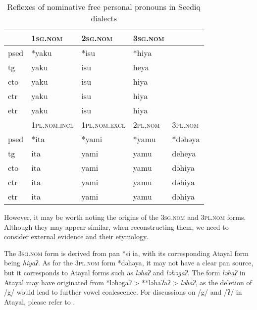 \begin{table}[!htbp]
\centering
\caption{Reflexes of nominative free personal pronouns in Seediq dialects}
\label{tab:nomfree}
\begin{tabular}{lllll}
\hline
      & \textsc{1sg.nom}      & \textsc{2sg.nom}      & \textsc{3sg.nom} &         \\ \hline
\acs{psed} & *yaku        & *isu         & *hiya   &         \\
\acs{tg}  & yaku         & isu          & heya    &         \\
\acs{cto}  & yaku         & isu          & hiya    &         \\
\acs{ctr} & yaku         & isu          & hiya    &         \\
\acs{etr} & yaku         & isu          & hiya    &         \\ \hline
      & \textsc{1pl.nom.incl} & \textsc{1pl.nom.excl} & \textsc{2pl.nom} & \textsc{3pl.nom} \\ \hline
\acs{psed} & *ita         & *yami        & *yamu   & *dəhəya \\
\acs{tg}  & ita          & yami         & yamu    & deheya  \\
\acs{cto}  & ita          & yami         & yamu    & dəhiya  \\
\acs{ctr} & ita          & yami         & yamu    & dəhiya  \\
\acs{etr} & ita          & yami         & yamu    & dəhiya  \\ \hline
\end{tabular}
\end{table}

However, it may be worth noting the origins of the \textsc{3sg.nom} and \textsc{3pl.nom} forms. Although they may appear similar, when reconstructing them, we need to consider external evidence and their etymology.

The \textsc{3sg.nom} form is derived from \acs{pan} *si ia, with its corresponding Atayal form being \textit{hiyaʔ}. As for the \textsc{3pl.nom} form *dəhəya, it may not have a clear \acs{pan} source, but it corresponds to Atayal forms such as \textit{ləhaʔ} and \textit{ləhəgaʔ}. The form \textit{ləhaʔ} in Atayal may have originated from *ləhəgaʔ > **ləhaʔaʔ > \textit{ləhaʔ}, as the deletion of /g/ would lead to further vowel coalescence. For discussions on /g/ and /ʔ/ in Atayal, please refer to \textcite{goderich2020phd,song2023Aicgprime}. 


